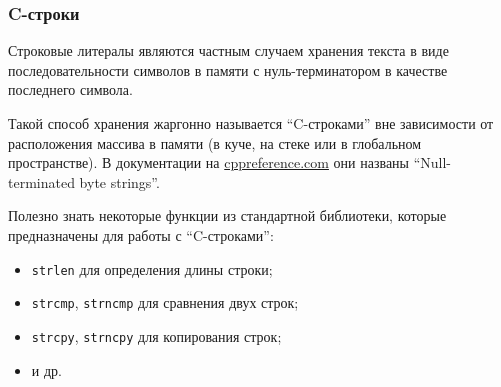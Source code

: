 \documentclass[compress, 8pt, aspectratio=169]{beamer}
\begin{document}
\begin{frame}[fragile]

    \frametitle{C-строки}

    Строковые литералы являются частным случаем хранения текста
    в виде последовательности символов в памяти с нуль-терминатором
    в качестве последнего символа.

    \hfill \break
    Такой способ хранения жаргонно называется \enquote{C-строками}
    вне зависимости от расположения массива в памяти (в куче, на стеке или
    в глобальном пространстве).
    В документации на \href{https://en.cppreference.com/}{cppreference.com} они названы
    \enquote{Null-terminated byte strings}\footnotemark{}.


    \hfill \break
    Полезно знать некоторые функции из стандартной библиотеки, которые
    предназначены для работы с \enquote{C-строками}:

    \begin{itemize}

        \item \texttt{strlen} \textemdash \space для определения длины строки;

        \item \texttt{strcmp}, \texttt{strncmp} \textemdash \space
            для сравнения двух строк;

        \item \texttt{strcpy}, \texttt{strncpy} \textemdash \space
            для копирования строк;

        \item и др.

    \end{itemize}

\end{frame}
\end{document}
